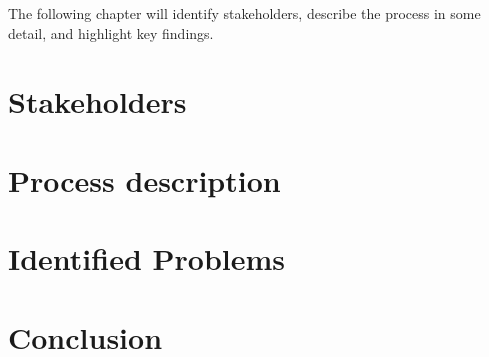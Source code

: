 The following chapter will identify stakeholders, describe the process in some detail, and highlight key findings.

\section{Stakeholders}

\section{Process description}

\section{Identified Problems}

\section{Conclusion}
